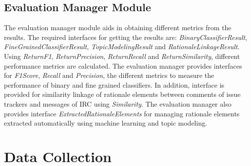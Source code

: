 \documentclass[a4paper,12pt,twoside]{report}
\begin{document}
\section{Evaluation Manager Module}
The evaluation manager module aids in obtaining different metrics from the results. The required interfaces for getting the results are: \textit{BinaryClassifierResult}, \textit{FineGrainedClassifierResult}, \textit{TopicModelingResult} and \textit{RationaleLinkageResult}. Using \textit{ReturnF1}, \textit{ReturnPrecision}, \textit{ReturnRecall} and \textit{ReturnSimilarity}, different performance metrics are calculated. The evaluation manager provides interfaces for \textit{F1Score}, \textit{Recall} and \textit{Precision}, the different metrics to measure the performance of binary and fine grained classifiers. In addition, interface is provided for similarity linkage of rationale elements between comments of issue trackers and messages of \acs{IRC} using \textit{Similarity}. The evaluation manager also provides interface \textit{ExtractedRationaleElements} for managing rationale elements extracted automatically using machine learning and topic modeling.


\chapter{Data Collection}
\end{document}
